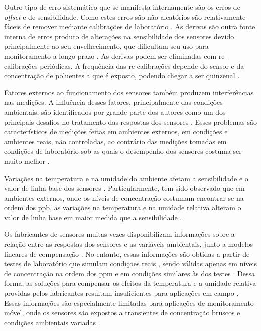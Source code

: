 Outro tipo de erro sistemático que se manifesta internamente são os erros de \textit{offset} e de sensibilidade. Como estes erros são não aleatórios são relativamente fáceis de remover mediante calibrações de laboratório \cite{Spinelle2013ProtocolPollution}. As derivas são outra fonte interna de erros produto de alterações na sensibilidade dos sensores devido principalmente ao seu envelhecimento, que dificultam seu uso para monitoramento a longo prazo \cite{Feng2019ReviewTechnology}. As derivas podem ser eliminadas com re-calibrações periódicas. A frequência das re-calibrações depende do sensor e da concentração de poluentes a que é exposto, podendo chegar a ser quinzenal \cite{Concas2021LOW-COSTPREPRINT}.

Fatores externos ao funcionamento dos sensores também produzem interferências nas medições. A influência desses fatores, principalmente das condições ambientais, são identificados por grande parte dos autores como um dos principais desafios no tratamento das respostas dos sensores \cite{Mead2013TheNetworks,Popoola2016DevelopmentStability,Rai2017End-userMonitoring,Baron2017AmperometricReview}. Esses problemas são característicos de medições feitas em ambientes externos, em condições e ambientes reais, não controladas, ao contrário das medições tomadas em condições de laboratório sob as quais o desempenho dos sensores costuma ser muito melhor \cite{Castell2017CanEstimates}.

Variações na temperatura e na umidade do ambiente afetam a sensibilidade e o valor de linha base dos sensores \cite{Popoola2016DevelopmentStability,Pang2018TheMonitoring}. Particularmente, tem sido observado que em ambientes externos, onde os níveis de concentração costumam encontrar-se na ordem dos \gls{ppb}, as variações na temperatura e na umidade relativa alteram o valor de linha base em maior medida que a sensibilidade \cite{Popoola2016DevelopmentStability}.

Os fabricantes de sensores muitas vezes disponibilizam informações sobre a relação entre as respostas dos sensores e as variáveis ambientais, junto a modelos lineares de compensação \cite{Alphasense2013AlphasenseHUMIDITY,SPECSensors2016ApplicationPerformance}. No entanto, essas informações são obtidas a partir de testes de laboratório que simulam condições reais \cite{Spinelle2013ProtocolPollution}, sendo válidas apenas em níveis de concentração na ordem dos \gls{ppm} e em condições similares às dos testes \cite{Lewis2018Low-costApplications}. Dessa forma, as soluções para compensar os efeitos da temperatura e a umidade relativa providas pelos fabricantes resultam insuficientes para aplicações em campo \cite{Pang2018TheMonitoring}. Essas informações são especialmente limitadas para aplicações de monitoramento móvel, onde os sensores são expostos a transientes de concentração bruscos e condições ambientais variadas \cite{Delaine2019InReview}.
	
